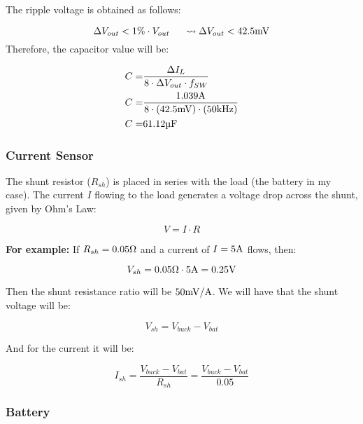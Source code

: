 The ripple voltage is obtained as follows:

\begin{equation*}
  \Delta V_{out} < 1\% \cdot V_{out} \hspace{0.5cm} \rightsquigarrow \Delta V_{out} < 42.5\si{\milli\volt}
\end{equation*} 
Therefore, the capacitor value will be:

\begin{align}\label{CondensadorBuck}
    C =& \frac{\Delta I_{L}}{8\cdot \Delta V_{out} \cdot f_{SW}}\notag\\
    C =& \frac{1.039\ampere}{8\cdot (42.5\si{\milli\volt}) \cdot (50\si{\kHz})}\notag\\
    C =& 61.12\si{\micro\farad}
\end{align}

\subsubsection{Current Sensor}

The shunt resistor ($R_{sh}$) is placed in series with the load (the battery in my case). The current $I$ flowing to the load generates a voltage drop across the shunt, given by Ohm's Law:

\begin{equation*}
    V = I \cdot R
\end{equation*} 

\textbf{For example:} If $R_{sh} = 0.05 \ohm$ and a current of $I=5\ampere$ flows, then:

\begin{equation*}
    V_{sh} = 0.05 \ohm \cdot 5\ampere = 0.25\volt
\end{equation*}

Then the shunt resistance ratio will be $50\si{\milli\volt}/\ampere$. We will have that the shunt voltage will be:

\begin{equation}\label{TensionShunt}
    V_{sh} = V_{buck} - V_{bat}
\end{equation}

And for the current it will be:

\begin{equation}\label{CorrienteSunt}
    I_{sh} = \frac{V_{buck} - V_{bat}}{R_{sh}} = \frac{V_{buck} - V_{bat}}{0.05}
\end{equation}

\subsubsection{Battery}

